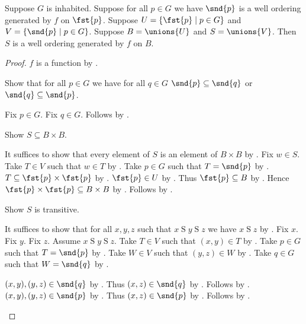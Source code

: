 \begin{lemma}\label{union_generated_well_orderings}
    Suppose $G$ is inhabited.
    Suppose for all $p\in G$ we have $\snd{p}$ is a well ordering generated by $f$ on $\fst{p}$.
    Suppose $U=\{\fst{p}\mid p\in G\}$ and $V=\{\snd{p}\mid p\in G\}$.
    Suppose $B=\unions{U}$ and $S=\unions{V}$.
    Then $S$ is a well ordering generated by $f$ on $B$.
\end{lemma}
\begin{proof}
    $f$ is a function by
        .

    Show that for all $p\in G$ we have for all $q\in G$
        $\snd{p}\subseteq\snd{q}$ or $\snd{q}\subseteq\snd{p}$.
    \begin{subproof}
        Fix $p\in G$.
        Fix $q\in G$.
        Follows by .
    \end{subproof}

    Show $S\subseteq B\times B$.
    \begin{subproof}
        It suffices to show that every element of $S$ is an element of $B\times B$ by .
        Fix $w\in S$.
        Take $T\in V$ such that $w\in T$ by .
        Take $p\in G$ such that $T=\snd{p}$ by \auto.
        $T\subseteq\fst{p}\times\fst{p}$ by .
        $\fst{p}\in U$ by \auto.
        Thus $\fst{p}\subseteq B$ by .
        Hence $\fst{p}\times\fst{p}\subseteq B\times B$
            by .
        Follows by .
    \end{subproof}

    Show $S$ is transitive.
    \begin{subproof}
        It suffices to show that for all $x,y,z$ such that $x\mathrel{S}y\mathrel{S}z$
            we have $x\mathrel{S}z$ by .
        Fix $x$.
        Fix $y$.
        Fix $z$.
        Assume $x\mathrel{S}y\mathrel{S}z$.
        Take $T\in V$ such that $(x,y)\in T$ by .
        Take $p\in G$ such that $T=\snd{p}$ by \auto.
        Take $W\in V$ such that $(y,z)\in W$ by .
        Take $q\in G$ such that $W=\snd{q}$ by \auto.
        \begin{byCase}
            $(x,y),(y,z)\in\snd{q}$ by .
            Thus $(x,z)\in\snd{q}$ by .
            Follows by .
            $(x,y),(y,z)\in\snd{p}$ by .
            Thus $(x,z)\in\snd{p}$ by .
            Follows by .
        \end{byCase}
    \end{subproof}


\end{proof}
